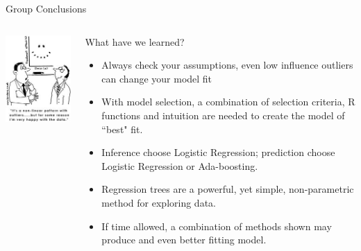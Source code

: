 \documentclass[table]{beamer}\usepackage[]{graphicx}\usepackage[]{color}
\begin{document}
\begin{frame}{Group Conclusions}
\begin{columns}[t]
\begin{column}[t]{4cm}

\includegraphics[width=\textwidth]{happy}

\end{column}


\begin{column}[t]{8cm}
What have we learned? 

\begin{itemize}
  \item Always check your assumptions, even low influence outliers can change your model fit
  \item With model selection, a combination of selection criteria, R functions and intuition are needed to create the model of ``best" fit. 
  \item Inference choose Logistic Regression; prediction choose Logistic Regression or Ada-boosting.
  \item Regression trees are a powerful, yet simple, non-parametric method for exploring data.
  \item If time allowed, a combination of methods shown may produce and even better fitting model.
\end{itemize}
\end{column}
\end{columns}
\end{frame}

\end{document}
